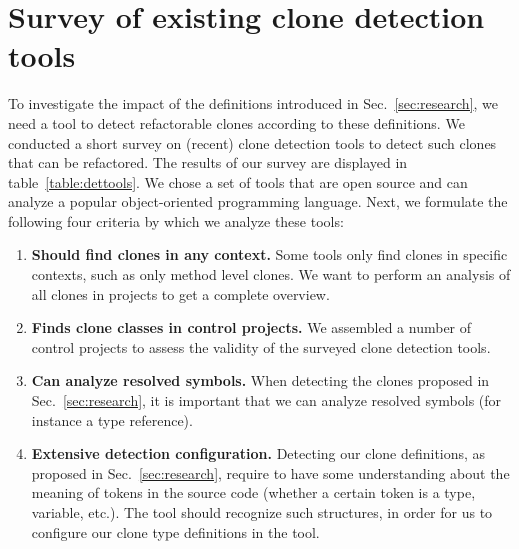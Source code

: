 \documentclass[sigconf,review,anonymous]{acmart}
\begin{document}
\section{Survey of existing clone detection tools}\label{sec:survey}
To investigate the impact of the definitions introduced in Sec.~\ref{sec:research}, we need a tool to detect refactorable clones according to these definitions. We conducted a short survey on (recent) clone detection tools to detect such clones that can be refactored. The results of our survey are displayed in table~\ref{table:dettools}. We chose a set of tools that are open source and can analyze a popular object-oriented programming language. Next, we formulate the following four criteria by which we analyze these tools:
\begin{enumerate}
    \item \textbf{Should find clones in any context.} Some tools only find clones in specific contexts, such as only method level clones. We want to perform an analysis of all clones in projects to get a complete overview.
\item \textbf{Finds clone classes in control projects.} We assembled a number of control projects to assess the validity of the surveyed clone detection tools.
\item \textbf{Can analyze resolved symbols.} When detecting the clones proposed in Sec.~\ref{sec:research}, it is important that we can analyze resolved symbols (for instance a type reference).
\item \textbf{Extensive detection configuration.} Detecting our clone definitions, as proposed in Sec.~\ref{sec:research}, require to have some understanding about the meaning of tokens in the source code (whether a certain token is a type, variable, etc.). The tool should recognize such structures, in order for us to configure our clone type definitions in the tool.
\end{enumerate}
\end{document}
